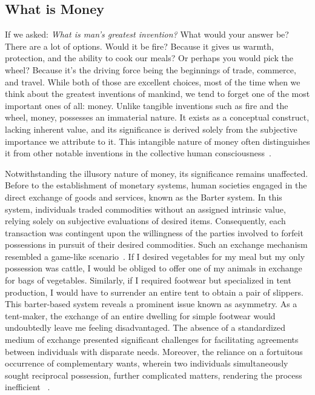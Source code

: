 \subsection{What is Money}
If we asked: \textit{What is man's greatest invention?} What would your answer be? There are a lot of options. Would it
be fire? Because it gives us warmth, protection, and the ability to cook our meals? Or perhaps you would pick the wheel?
Because it's the driving force being the beginnings of trade, commerce, and travel. While both of those are excellent
choices, most of the time when we think about the greatest inventions of mankind, we tend to forget one of the most
important ones of all: money. Unlike tangible inventions such as fire and the wheel, money, possesses an immaterial
nature. It exists as a conceptual construct, lacking inherent value, and its significance is derived solely from the
subjective importance we attribute to it. This intangible nature of money often distinguishes it from other notable
inventions in the collective human consciousness~\cite{smith2010wealth}.

Notwithstanding the illusory nature of money, its significance remains unaffected. Before to the establishment of monetary
systems, human societies engaged in the direct exchange of goods and services, known as the Barter system. In this system,
individuals traded commodities without an assigned intrinsic value, relying solely on subjective evaluations of desired
items. Consequently, each transaction was contingent upon the willingness of the parties involved to forfeit possessions
in pursuit of their desired commodities. Such an exchange mechanism resembled a game-like scenario~\cite{durlauf2016new}.
If I desired vegetables for my meal but my only possession was cattle, I would be obliged to offer one of my animals in
exchange for bags of vegetables. Similarly, if I required footwear but specialized in tent production, I would have to
surrender an entire tent to obtain a pair of slippers. This barter-based system reveals a prominent issue known as asymmetry.
As a tent-maker, the exchange of an entire dwelling for simple footwear would undoubtedly leave me feeling disadvantaged.
The absence of a standardized medium of exchange presented significant challenges for facilitating agreements between
individuals with disparate needs. Moreover, the reliance on a fortuitous occurrence of complementary wants, wherein two
individuals simultaneously sought reciprocal possession, further complicated matters, rendering the process inefficient
~\cite{goodhart1998two}.

